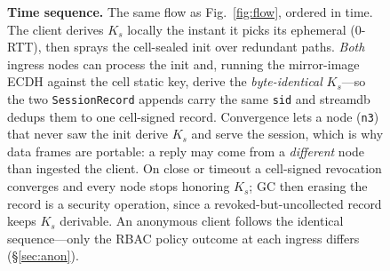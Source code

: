 \documentclass[10pt,twocolumn]{article}
\newcommand{\code}[1]{\texttt{\small #1}}
\newcommand{\Ks}{\ensuremath{K_s}}
\begin{document}
\begin{figure}[t]
\caption{\textbf{Time sequence.} The same flow as Fig.~\ref{fig:flow}, ordered in
time. The client derives \Ks{} locally the instant it picks its ephemeral (0-RTT),
then sprays the cell-sealed init over redundant paths. \emph{Both} ingress nodes
can process the init and, running the mirror-image ECDH against the cell static
key, derive the \emph{byte-identical} \Ks{}---so the two \code{SessionRecord}
appends carry the same \code{sid} and streamdb dedups them to one cell-signed
record. Convergence lets a node (\code{n3}) that never saw the init derive \Ks{}
and serve the session, which is why data frames are portable: a reply may come
from a \emph{different} node than ingested the client. On close or timeout a
cell-signed revocation converges and every node stops honoring \Ks{}; GC then
erasing the record is a security operation, since a revoked-but-uncollected record
keeps \Ks{} derivable. An anonymous client follows the identical sequence---only
the RBAC policy outcome at each ingress differs (\S\ref{sec:anon}).}
\label{fig:seq}
\end{figure}
\end{document}
